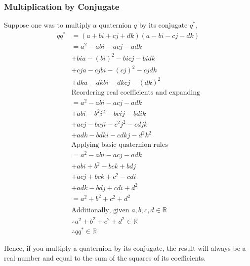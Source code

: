\documentclass[12pt, a4paper]{article}
\begin{document}
\subsubsection{Multiplication by Conjugate}
Suppose one was to multiply a quaternion $q$ by its conjugate $q^*$,
\begin{align*}
    qq^* & = (a + bi + cj + dk)(a - bi - cj - dk)            \\
         & = a^2 - abi - acj - adk                           \\
         & + bia - (bi)^2 - bicj - bidk                      \\
         & + cja - cjbi - (cj)^2 - cjdk                      \\
         & + dka - dkbi - dkcj - (dk)^2                      \\
         & \text{Reordering real coefficients and expanding} \\
         & = a^2 - abi - acj - adk                           \\
         & + abi - b^2i^2 - bcij - bdik                      \\
         & + acj - bcji - c^2j^2 - cdjk                      \\
         & + adk - bdki - cdkj - d^2k^2                      \\
         & \text{Applying basic quaternion rules}            \\
         & = a^2 - abi - acj - adk                           \\
         & + abi + b^2 - bck + bdj                           \\
         & + acj + bck + c^2 - cdi                           \\
         & + adk - bdj + cdi + d^2                           \\
         & = a^2 + b^2 + c^2 + d^2                           \\
         \\
         & \text{Additionally, given } a, b, c, d \in \mathbb{R} \\
         & \therefore a^2 + b^2 + c^2 + d^2 \in \mathbb{R}       \\
         & \therefore qq^* \in \mathbb{R}
\end{align*}

Hence, if you multiply a quaternion by its conjugate, the result will always be
a real number and equal to the sum of the squares of its coefficients. \\
\end{document}

